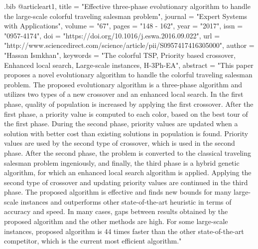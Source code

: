 \RequirePackage{filecontents}
\begin{filecontents}{\jobname.bib}
	@article{art1,
		title = "Effective three-phase evolutionary algorithm to handle the large-scale colorful traveling salesman problem",
		journal = "Expert Systems with Applications",
		volume = "67",
		pages = "148 - 162",
		year = "2017",
		issn = "0957-4174",
		doi = "https://doi.org/10.1016/j.eswa.2016.09.022",
		url = "http://www.sciencedirect.com/science/article/pii/S0957417416305000",
		author = "Hassan Ismkhan",
		keywords = "The colorful TSP, Priority based crossover, Enhanced local search, Large-scale instances, H-3Ph-EA",
		abstract = "This paper proposes a novel evolutionary algorithm to handle the colorful traveling salesman problem. The proposed evolutionary algorithm is a three-phase algorithm and utilizes two types of a new crossover and an enhanced local search. In the first phase, quality of population is increased by applying the first crossover. After the first phase, a priority value is computed to each color, based on the best tour of the first phase. During the second phase, priority values are updated when a solution with better cost than existing solutions in population is found. Priority values are used by the second type of crossover, which is used in the second phase. After the second phase, the problem is converted to the classical traveling salesman problem ingeniously, and finally, the third phase is a hybrid genetic algorithm, for which an enhanced local search algorithm is applied. Applying the second type of crossover and updating priority values are continued in the third phase. The proposed algorithm is effective and finds new bounds for many large-scale instances and outperforms other state-of-the-art heuristic in terms of accuracy and speed. In many cases, gaps between results obtained by the proposed algorithm and the other methods are high. For some large-scale instances, proposed algorithm is 44 times faster than the other state-of-the-art competitor, which is the current most efficient algorithm."
	}
	

\end{filecontents}
